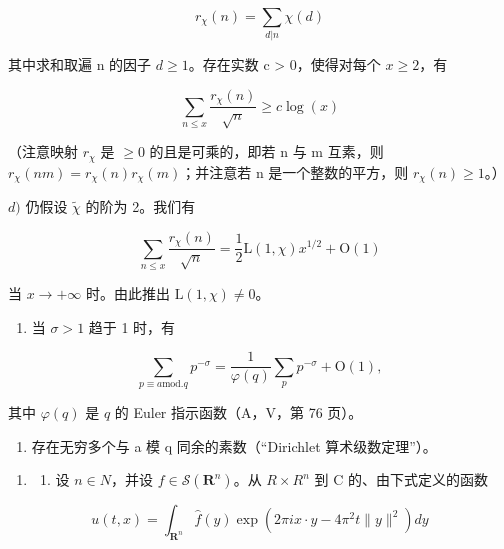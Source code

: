 \[
r _ {\chi} (n) = \sum_ {d | n} \chi (d)
\]

其中求和取遍 n 的因子 \(d \geqslant 1\)。存在实数 c \textgreater{} 0，使得对每个 \(x \geqslant 2\)，有

\[
\sum_ {n \leqslant x} \frac {r _ {\chi} (n)}{\sqrt {n}} \geqslant c \log (x)
\]

（注意映射 \(r_{\chi}\) 是 \(\geqslant 0\) 的且是可乘的，即若 n 与 m 互素，则 \(r_{\chi}(nm) = r_{\chi}(n)r_{\chi}(m)\)；并注意若 n 是一个整数的平方，则 \(r_{\chi}(n) \geqslant 1\)。）

\(d)\) 仍假设 \(\widetilde{\chi}\) 的阶为 2。我们有

\[
\sum_ {n \leqslant x} \frac {r _ {\chi} (n)}{\sqrt {n}} = \frac {1}{2} \mathrm{L} (1, \chi) x ^ {1 / 2} + \mathrm{O} (1)
\]

当 \(x \to +\infty\) 时。由此推出 \(\mathrm{L}(1, \chi) \neq 0\)。

\begin{enumerate}
\def\labelenumi{\alph{enumi})}
\setcounter{enumi}{4}
\tightlist
\item
  当 \(\sigma > 1\) 趋于 1 时，有
\end{enumerate}

\[
\sum_ {p \equiv a \text {mod.} q} p ^ {- \sigma} = \frac {1}{\varphi (q)} \sum_ {p} p ^ {- \sigma} + \mathrm{O} (1),
\]

其中 \(\varphi(q)\) 是 \(q\) 的 Euler 指示函数（A，V，第 76 页）。

\begin{enumerate}
\def\labelenumi{\alph{enumi})}
\setcounter{enumi}{5}
\tightlist
\item
  存在无穷多个与 a 模 q 同余的素数（“Dirichlet 算术级数定理”）。
\end{enumerate}

\begin{enumerate}
\def\labelenumi{\arabic{enumi})}
\setcounter{enumi}{17}
\tightlist
\item
  \begin{enumerate}
  \def\labelenumii{\alph{enumii})}
  \tightlist
  \item
    设 \(n \in N\)，并设 \(f \in \mathcal{S}(\mathbf{R}^{n})\)。从 \(R \times R^{n}\) 到 C 的、由下式定义的函数
  \end{enumerate}
\end{enumerate}

\[
u (t, x) = \int_ {\mathbf {R} ^ {n}} \widehat {f} (y) \exp (2 \pi i x \cdot y - 4 \pi^ {2} t \| y \| ^ {2}) d y
\]

